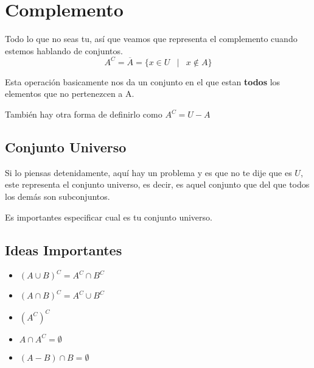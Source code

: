 \documentclass[12pt, fleqn]{report}                             %
\DeclareMathOperator \Space {\quad}                             %
\DeclareMathOperator \MiniSpace {\;}                            %
\newcommand \Such {\MiniSpace|\MiniSpace}                       %
\begin{document}
        \clearpage
        \section{Complemento}

            Todo lo que no seas tu, así que veamos que representa el complemento cuando estemos
            hablando de conjuntos.
            \begin{equation*}
                A^C = \overline A = \{ x \in U \Such x \notin A \}
            \end{equation*}

            Esta operación basicamente nos da un conjunto en el que estan \textbf{todos} los elementos
            que no pertenezcen a A.

            También hay otra forma de definirlo como $A^C = U - A$

            \subsection{Conjunto Universo}
                Si lo piensas detenidamente, aquí hay un problema y es que no te dije que es $U$, este
                representa el conjunto universo, es decir, es aquel conjunto que del que todos los demás
                son subconjuntos.

                Es importantes especificar cual es tu conjunto universo.


            \subsection{Ideas Importantes}

                \begin{itemize}
                    \item $(A \cup B)^C = A^C \cap B^C$

                    \item $(A \cap B)^C = A^C \cup B^C$

                    \item $(A^C)^C$

                    \item $A \cap A^C = \emptyset$

                    \item $(A - B) \cap B = \emptyset$

                \end{itemize}
\end{document}

